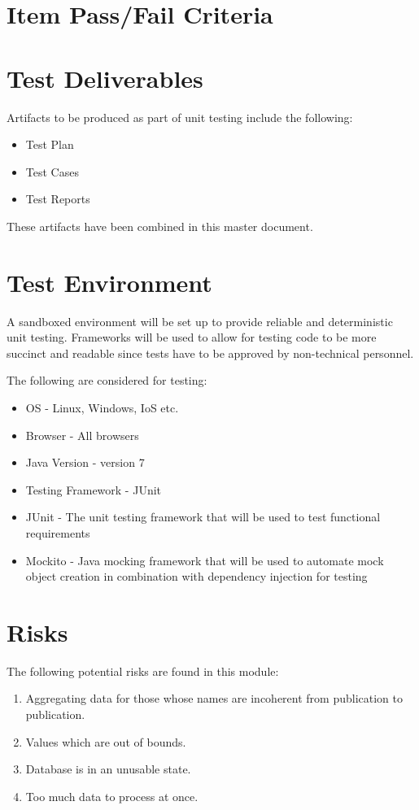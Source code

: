 \section{Item Pass/Fail Criteria}
\label{passFileCrit}
  

\section{Test Deliverables}
\label{testDeliverables}
Artifacts to be produced as part of unit testing include the following:
\begin{itemize}
	\item Test Plan
	\item Test Cases 
	\item Test Reports
\end{itemize}
These artifacts have been combined in this master document.
\section{Test Environment} 
\label{testEnv}
A sandboxed environment will be set up to provide reliable and deterministic unit testing. Frameworks will be used to allow for testing code to be more succinct and readable since tests have to be approved by non-technical personnel.
\par The following are considered for testing:
\begin{itemize} 
	\item OS - Linux, Windows, IoS etc.
	\item Browser - All browsers
	\item Java Version - version 7
	\item Testing Framework - JUnit
	\item JUnit - The unit testing framework that will be used to test functional requirements
	\item Mockito - Java mocking framework that will be used to automate mock object creation in combination with dependency injection for testing
\end{itemize}

\section{Risks}
\label{risks}
	The following potential risks are found in this module:
\begin{enumerate}
	\item Aggregating data for those whose names are incoherent from publication to publication.
	\item Values  which are out of bounds.
	\item Database is in an unusable state.
	\item Too much data to process at once.
\end{enumerate}

